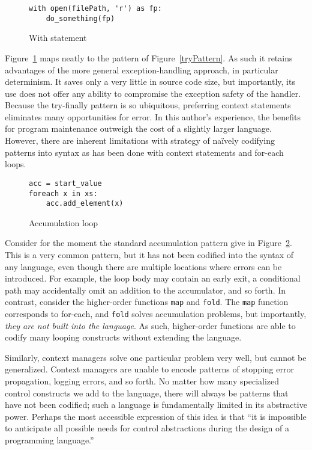 \documentclass[11pt]{article}
\begin{document}
\begin{figure}[H]
\caption{With statement}
\label{withStatement}
\begin{verbatim}
with open(filePath, 'r') as fp:
    do_something(fp)
\end{verbatim}
\end{figure}

Figure~\ref{withStatement} maps neatly to the pattern of Figure~\ref{tryPattern}.
As such it retains advantages of the more general exception-handling approach, in particular determinism.
It saves only a very little in source code size, but importantly, its use does not offer any ability to compromise the exception safety of the handler.
Because the try-finally pattern is so ubiquitous, preferring context statements eliminates many opportunities for error.
In this author's experience, the benefits for program maintenance outweigh the cost of a slightly larger language.
However, there are inherent limitations with strategy of na\"ively codifying patterns into syntax as has been done with context statements and for-each loops.

\begin{figure}[H]
\caption{Accumulation loop}
\label{accumLoop}
\begin{verbatim}
acc = start_value
foreach x in xs:
    acc.add_element(x)
\end{verbatim}
\end{figure}

Consider for the moment the standard accumulation pattern give in Figure~\ref{accumLoop}.
This is a very common pattern, but it has not been codified into the syntax of any language, even though there are multiple locations where errors can be introduced.
For example, the loop body may contain an early exit, a conditional path may accidentally omit an addition to the accumulator, and so forth.
In contrast, consider the higher-order functions \texttt{map} and \texttt{fold}.
The \texttt{map} function corresponds to for-each, and \texttt{fold} solves accumulation problems, but importantly, \emph{they are not built into the language}.
As such, higher-order functions are able to codify many looping constructs without extending the language.

Similarly, context managers solve one particular problem very well, but cannot be generalized.
Context managers are unable to encode patterns of stopping error propagation, logging errors, and so forth.
No matter how many specialized control constructs we add to the language, there will always be patterns that have not been codified; such a language is fundamentally limited in its abstractive power.
Perhaps the most accessible expression of this idea is that ``it is impossible to anticipate all possible needs for control abstractions during the design of a programming language.''\cite{ControlDelimitersHierarchy}
\end{document}
